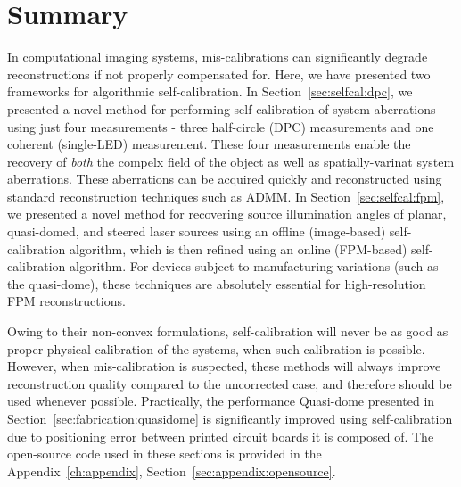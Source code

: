 \section{Summary}

In computational imaging systems, mis-calibrations can significantly degrade reconstructions if not properly compensated for. Here, we have presented two frameworks for algorithmic self-calibration. In Section~\ref{sec:selfcal:dpc}, we presented a novel method for performing self-calibration of system aberrations using just four measurements - three half-circle (DPC) measurements and one coherent (single-LED) measurement. These four measurements enable the recovery of \textit{both} the compelx field of the object as well as spatially-varinat system aberrations. These aberrations can be acquired quickly and reconstructed using standard reconstruction techniques such as ADMM. In Section~\ref{sec:selfcal:fpm}, we presented a novel method for recovering source illumination angles of planar, quasi-domed, and steered laser sources using an offline (image-based) self-calibration algorithm, which is then refined using an online (FPM-based) self-calibration algorithm. For devices subject to manufacturing variations (such as the quasi-dome), these techniques are absolutely essential for high-resolution FPM reconstructions.

Owing to their non-convex formulations, self-calibration will never be as good as proper physical calibration of the systems, when such calibration is possible. However, when mis-calibration is suspected, these methods will always improve reconstruction quality compared to the uncorrected case, and therefore should be used whenever possible. Practically, the performance Quasi-dome presented in Section~\ref{sec:fabrication:quasidome} is significantly improved using self-calibration due to positioning error between printed circuit boards it is composed of. The open-source code used in these sections is provided in the Appendix~\ref{ch:appendix}, Section~\ref{sec:appendix:opensource}.
